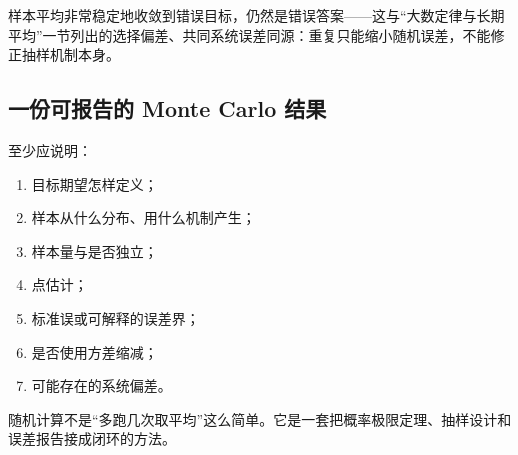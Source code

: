 样本平均非常稳定地收敛到错误目标，仍然是错误答案——这与``大数定律与长期平均''一节列出的选择偏差、共同系统误差同源：重复只能缩小随机误差，不能修正抽样机制本身。

\subsection{一份可报告的 Monte Carlo 结果}

至少应说明：

\begin{enumerate}
\def\labelenumi{\arabic{enumi}.}
\tightlist
\item
  目标期望怎样定义；
\item
  样本从什么分布、用什么机制产生；
\item
  样本量与是否独立；
\item
  点估计；
\item
  标准误或可解释的误差界；
\item
  是否使用方差缩减；
\item
  可能存在的系统偏差。
\end{enumerate}

随机计算不是``多跑几次取平均''这么简单。它是一套把概率极限定理、抽样设计和误差报告接成闭环的方法。

